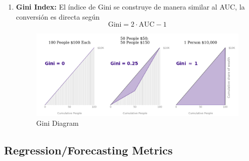 \begin{enumerate}
    \item \textbf{Gini Index: } El índice de Gini se construye de manera similar al AUC, la conversión es directa según 
    $$ 
    \text{Gini} = 2 \cdot \text{AUC} - 1 
    $$
    \begin{figure}[H]
    \center
    \includegraphics[scale=0.3]{notebooks/Basic/img/gini_diagram.png}
    \caption{Gini Diagram}
    \end{figure}
    
\end{enumerate}

\subsection{Regression/Forecasting Metrics}

